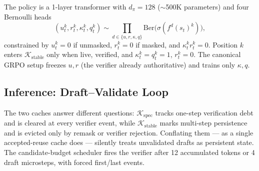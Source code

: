 \documentclass[11pt]{article}
\newenvironment{algorithmic}[1][]{
    \begin{enumerate}
    \setlength{\itemsep}{1pt}
    \setlength{\parskip}{0pt}
  }{
    \end{enumerate}
  }
\newcommand{\State}{\item}
\newcommand{\For}[1]{\item \textbf{for} ##1 \textbf{do}}
\newcommand{\EndFor}{\item \textbf{end for}}
\newcommand{\If}[1]{\item \textbf{if} ##1 \textbf{then}}
\newcommand{\EndIf}{\item \textbf{end if}}
\newcommand{\cK}{\mathcal{K}}
\newcommand{\cC}{\mathcal{C}}
\newcommand{\btheta}{\bm{\theta}}
\newcommand{\bx}{\mathbf{x}}
\newcommand{\by}{\mathbf{y}}
\newcommand{\ind}{\mathbb{I}}
\newcommand{\mask}{\ensuremath{\mathtt{[M]}}}
\begin{document}
The policy is a 1-layer transformer with $d_\pi{=}128$ (${\sim}$500K parameters) and four Bernoulli heads
\begin{equation*}
    (u_t^k, r_t^k, \kappa_t^k, q_t^k) \sim \prod_{d \in \{u,r,\kappa,q\}}\!\! \text{Ber}\!\bigl(\sigma(f^d(s_t)^k)\bigr),
\end{equation*}
constrained by $u_t^k{=}0$ if unmasked, $r_t^k{=}0$ if masked, and $\kappa_t^k r_t^k{=}0$.
Position $k$ enters $\cK_{\text{stable}}$ only when live, verified, and $\kappa_t^k{=}q_t^k{=}1$, $r_t^k{=}0$.
The canonical GRPO setup freezes $u, r$ (the verifier already authoritative) and trains only $\kappa, q$.

\subsection{Inference: Draft--Validate Loop}


The two caches answer different questions: $\cK_{\text{spec}}$ tracks one-step verification debt and is cleared at every verifier event, while $\cK_{\text{stable}}$ marks multi-step persistence and is evicted only by remask or verifier rejection.  Conflating them — as a single accepted-reuse cache does — silently treats unvalidated drafts as persistent state.  The candidate-budget scheduler fires the verifier after 12 accumulated tokens or 4 draft microsteps, with forced first/last events.
\end{document}
